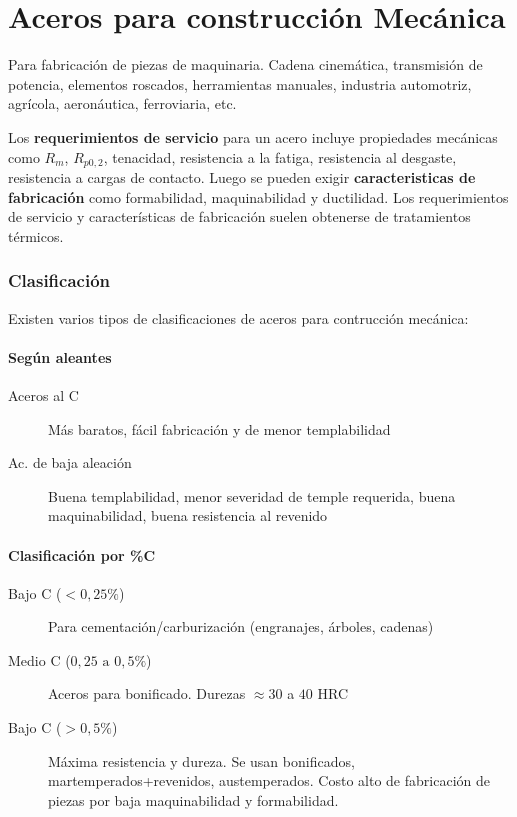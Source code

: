 \part{Aceros para construcción Mecánica}
Para fabricación de piezas de maquinaria. Cadena cinemática, transmisión de potencia, elementos roscados, herramientas manuales, industria automotriz, agrícola, aeronáutica, ferroviaria, etc.

Los \textbf{requerimientos de servicio} para un acero incluye propiedades mecánicas como $R_m$, $R_{p0,2}$, tenacidad, resistencia a la fatiga, resistencia al desgaste, resistencia a cargas de contacto. Luego se pueden exigir \textbf{caracteristicas de fabricación} como formabilidad, maquinabilidad y ductilidad. Los requerimientos de servicio y características de fabricación suelen obtenerse de tratamientos térmicos.

\section{Clasificación}

Existen varios tipos de clasificaciones de aceros para contrucción mecánica:

\subsection*{Según aleantes}
\begin{description}
	\item[Aceros al C] Más baratos, fácil fabricación y de menor templabilidad
	\item[Ac. de baja aleación] Buena templabilidad, menor severidad de temple requerida, buena maquinabilidad, buena resistencia al revenido
\end{description}


\subsection*{Clasificación por \%C}
\begin{description}
	\item[Bajo C ($<0,25\%$)] Para cementación/carburización (engranajes, árboles, cadenas)
	\item[Medio C ($0,25 \textrm{ a }0,5\%$)] Aceros para bonificado. Durezas $\approx 30$ a $40$ HRC
	\item[Bajo C ($>0,5\%$)] Máxima resistencia y dureza. Se usan bonificados, martemperados+revenidos, austemperados. Costo alto de fabricación de piezas por baja maquinabilidad y formabilidad.
\end{description}

